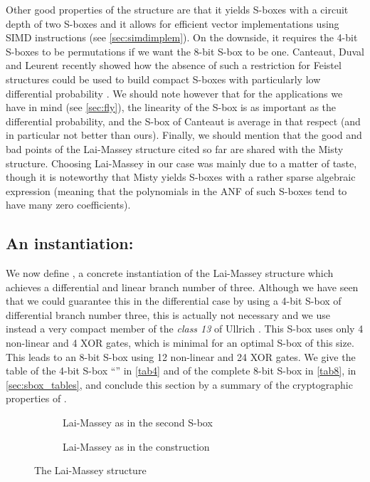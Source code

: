 Other good properties of the structure are that it yields S-boxes with a
circuit depth of two S-boxes and it allows for efficient vector implementations using SIMD instructions
(see \autoref{sec:simdimplem}).
On the downside, it requires the 4-bit S-boxes to be permutations if we want the
8-bit S-box to be one. Canteaut, Duval and Leurent recently showed how the absence of such a restriction
for Feistel structures could be used to build compact S-boxes with particularly low differential probability
\cite{sac15}. We should note however that for the applications we have in mind (see \autoref{sec:fly}),
the linearity of the
S-box is as important as the differential probability, and the S-box of Canteaut \etal is
average in that respect (and in particular not better than ours).
Finally, we should mention that the good and bad points of the Lai-Massey structure cited so far
are shared with the Misty structure. Choosing Lai-Massey in our case was mainly due to a matter of
taste, though it is noteworthy that Misty yields S-boxes with a rather sparse algebraic expression
(meaning that the polynomials in the ANF of such S-boxes tend to have many zero coefficients).

\subsection{An instantiation: \littlunOne}

We now define \littlunOne, a concrete instantiation of the Lai-Massey structure which
achieves a differential and linear branch number of three.
Although we have seen that we could guarantee this in the differential case by using a 4-bit
S-box of differential branch number three, this is actually not necessary and we use instead a very compact
member of the \emph{class 13} of Ullrich \etal \cite{skew}. This S-box uses only 4 non-linear
and 4 XOR gates, which is minimal for an optimal S-box of this size. This leads to an
8-bit S-box using 12 non-linear and 24 XOR gates.
We give the table of the 4-bit S-box ``\littlunS'' in \autoref{tab4} and of the complete 8-bit
S-box in \autoref{tab8}, in \autoref{sec:sbox_tables}, and conclude this section by a summary of the cryptographic properties
of \littlunOne.

\begin{figure}[ht]
\centering
\begin{subfigure}[b]{0.45\textwidth}
\centering

\caption{Lai-Massey as in the \whirlpool second S-box\label{whirlpoolS}}
\end{subfigure}
\begin{subfigure}[b]{0.45\textwidth}
\centering

\caption{Lai-Massey as in the \littlun construction\label{littlunS}}
\end{subfigure}
\caption{The Lai-Massey structure}
\end{figure}

